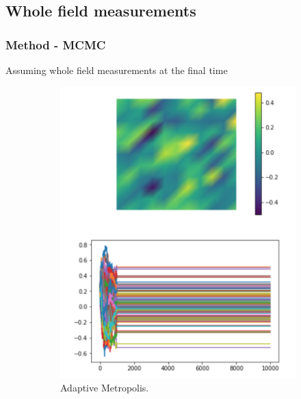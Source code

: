 \documentclass[9pt]{beamer}
\begin{document}
\subsection{Whole field measurements}
\begin{frame}
\frametitle{Method - MCMC}
 Assuming whole field measurements at the final time
\begin{figure}
\hspace{-1cm}
\begin{subfigure}{0.3\textwidth}
\vspace{-0.3cm}
	\includegraphics[scale = 0.3]{AM_noObs.png}
	\caption{Adaptive Metropolis.}
\end {subfigure}
\hspace{0.7cm}
\begin{subfigure}{0.3\textwidth}

\end{subfigure}
\end{figure}
\end{frame}
\end{document}
